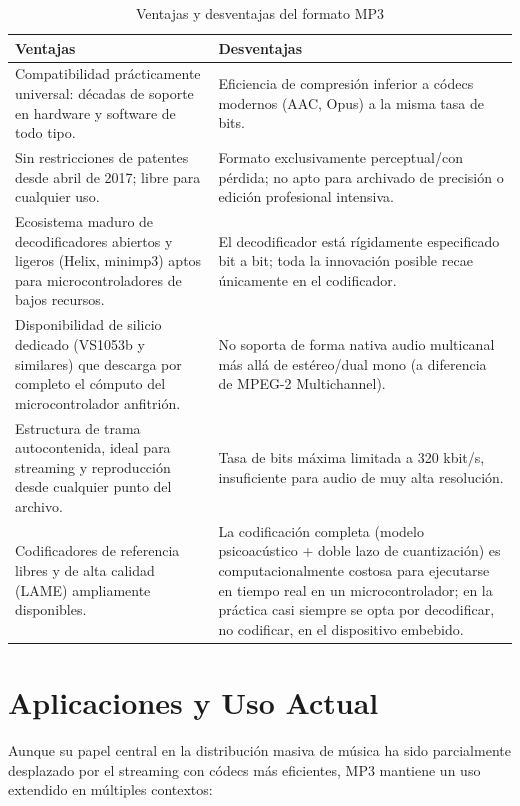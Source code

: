 \documentclass[pdflatex,sn-mathphys-num]{sn-jnl}%
\begin{document}
\begin{table}[!h]
\centering
\caption{Ventajas y desventajas del formato MP3}
\label{tab:proscons}
\begin{tabular}{|p{6.8cm}|p{6.8cm}|}
\hline
\textbf{Ventajas} & \textbf{Desventajas} \\ \hline
Compatibilidad prácticamente universal: décadas de soporte en hardware y software de todo tipo. & Eficiencia de compresión inferior a códecs modernos (AAC, Opus) a la misma tasa de bits. \\ \hline
Sin restricciones de patentes desde abril de 2017; libre para cualquier uso. & Formato exclusivamente perceptual/con pérdida; no apto para archivado de precisión o edición profesional intensiva. \\ \hline
Ecosistema maduro de decodificadores abiertos y ligeros (Helix, minimp3) aptos para microcontroladores de bajos recursos. & El decodificador está rígidamente especificado bit a bit; toda la innovación posible recae únicamente en el codificador. \\ \hline
Disponibilidad de silicio dedicado (VS1053b y similares) que descarga por completo el cómputo del microcontrolador anfitrión. & No soporta de forma nativa audio multicanal más allá de estéreo/dual mono (a diferencia de MPEG-2 Multichannel). \\ \hline
Estructura de trama autocontenida, ideal para streaming y reproducción desde cualquier punto del archivo. & Tasa de bits máxima limitada a 320 kbit/s, insuficiente para audio de muy alta resolución. \\ \hline
Codificadores de referencia libres y de alta calidad (LAME) ampliamente disponibles. & La codificación completa (modelo psicoacústico + doble lazo de cuantización) es computacionalmente costosa para ejecutarse en tiempo real en un microcontrolador; en la práctica casi siempre se opta por decodificar, no codificar, en el dispositivo embebido. \\ \hline
\end{tabular}
\end{table}

\section{Aplicaciones y Uso Actual}\label{sec:applications}
Aunque su papel central en la distribución masiva de música ha sido parcialmente desplazado por el streaming con códecs más eficientes, MP3 mantiene un uso extendido en múltiples contextos:
\end{document}
